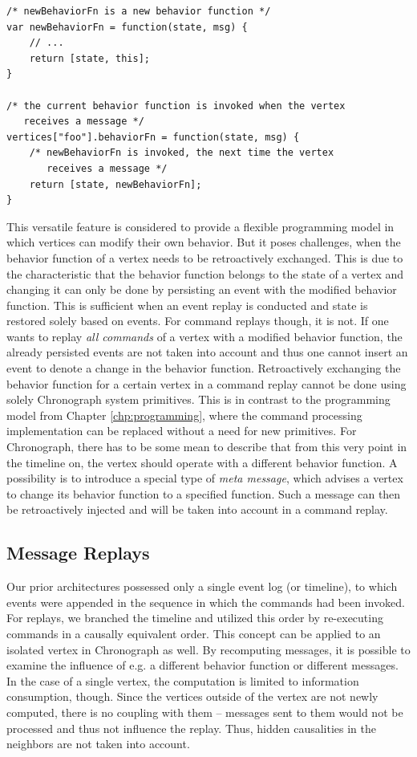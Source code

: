 \begin{lstlisting}[style=styled]
/* newBehaviorFn is a new behavior function */
var newBehaviorFn = function(state, msg) {
	// ...
	return [state, this];
}

/* the current behavior function is invoked when the vertex
   receives a message */
vertices["foo"].behaviorFn = function(state, msg) {
	/* newBehaviorFn is invoked, the next time the vertex 
	   receives a message */
	return [state, newBehaviorFn];
}
\end{lstlisting}

This versatile feature is considered to provide a flexible programming model
in which vertices can modify their own behavior.
%
But it poses challenges, when the  behavior function of a vertex needs to be 
retroactively exchanged.
This is due to the characteristic that the behavior function belongs to the
state of a vertex and changing it can only be done by persisting an event
with the modified behavior function.
This is sufficient when an event replay is conducted and state is restored 
solely based on events. For command replays though, it is not.
If one wants to replay \emph{all commands} of a vertex with a modified behavior 
function, the already persisted events are not taken into account and thus one 
cannot insert an event to denote a change in the behavior function.
Retroactively exchanging the behavior function for a certain vertex in a
command replay cannot be done using solely Chronograph system primitives. 
This is in contrast to the programming model from Chapter \ref{chp:programming}, 
where the command processing implementation can be replaced without a need for 
new primitives. 
For Chronograph, there has to be some mean to describe that from this very 
point in the timeline on, the vertex should operate with a different behavior 
function.
A possibility is to introduce a special type of \emph{meta message}, which
advises a vertex to change its behavior function to a specified function. 
Such a message can then be retroactively injected and will be taken into 
account in a command replay.

\subsection{Message Replays}
\label{sec:chronograph-replays}
Our prior architectures possessed only a single event log (or timeline), to
which events were appended in the sequence in which the commands had been 
invoked. For replays, we branched the timeline and utilized this order by 
re-executing commands in a causally equivalent order.
This concept can be applied to an isolated vertex in Chronograph as well.
By recomputing messages, it is possible to examine the influence of e.g. a
different behavior function or different messages.
In the case of a single vertex, the computation is limited to information
consumption, though. Since the vertices outside of the vertex are not newly
computed, there is no coupling with them -- messages sent to them would not
be processed and thus not influence the replay. 
Thus, hidden causalities in the neighbors are not taken into account.


